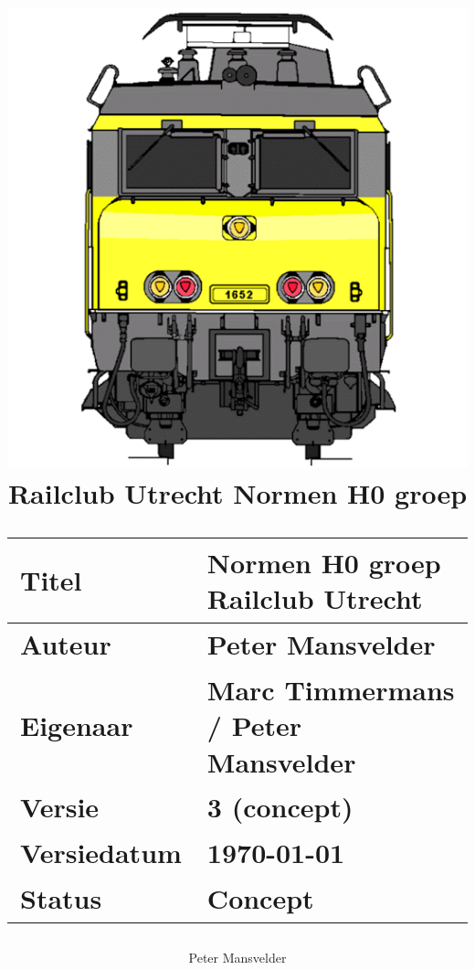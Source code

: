 \documentclass[12pt,a4paper]{report}
\newcommand*{\myfont}{\fontfamily{lmss}\normalsize\selectfont}
\begin{document}
\myfont

\title{
\includegraphics[scale=0.6]{images/RCU_logo}
\makebox[\linewidth]{\rule{\textwidth}{0.4pt}}
Railclub Utrecht
\vfill
Normen H0 groep\\
\makebox[\linewidth]{\rule{\textwidth}{0.4pt}}
\vfill
\small
\author{Peter Mansvelder}
\begin{tabular}{| l | l |}
\hline
\cellcolor[gray]{0.84}Titel & Normen H0 groep Railclub Utrecht\\
\hline
\cellcolor[gray]{0.84}Auteur & Peter Mansvelder\\
\hline
\cellcolor[gray]{0.84}Eigenaar & Marc Timmermans / Peter Mansvelder\\
\hline
\cellcolor[gray]{0.84}Versie & 3 (concept)\\
\hline
\cellcolor[gray]{0.84}Versiedatum & \today\\
\hline
\cellcolor[gray]{0.84}Status & Concept\\
\hline
\end{tabular}
}

\maketitle

\tableofcontents

\listoffigures
\end{document}
